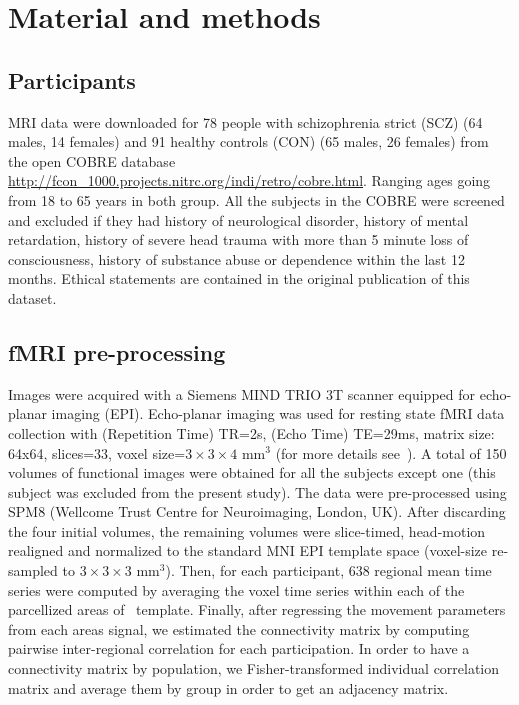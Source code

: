 
\section{Material and methods}
\subsection{Participants}
MRI data were downloaded for 78 people with schizophrenia strict (SCZ) (64 males, 14 females) and 91 healthy controls (CON) (65 males, 26 females) from the open COBRE database \url{http://fcon_1000.projects.nitrc.org/indi/retro/cobre.html}.
Ranging ages going from 18 to 65 years in both group.
All the subjects in the COBRE were screened and excluded if they had history of neurological disorder, history of mental retardation, history of severe head trauma with more than 5 minute loss of consciousness, history of substance abuse or dependence within the last 12 months.
Ethical statements are contained in the original publication of this dataset.

\subsection{fMRI pre-processing}
Images were acquired with a Siemens MIND TRIO 3T scanner equipped for echo-planar imaging (EPI).
Echo-planar imaging was used for resting state fMRI data collection with (Repetition Time) TR=2s, (Echo Time) TE=29ms, matrix size: 64x64, slices=33, voxel size=$3 \times 3 \times 4$ mm$^3$ (for more details see~\cite{cetin2014}). A total of 150 volumes of functional images were obtained for all the subjects except one (this subject was excluded from the present study). The data were pre-processed using SPM8 (Wellcome Trust Centre for Neuroimaging, London, UK).
After discarding the four initial volumes, the remaining volumes were slice-timed, head-motion realigned and normalized to the standard MNI EPI template space (voxel-size re-sampled to $3 \times 3 \times 3$ mm$^3$).
Then, for each participant, 638 regional mean time series were computed by averaging the voxel time series within each of the parcellized areas of~\cite{crossley2013a} template. 
Finally, after regressing the movement parameters from each areas signal, we estimated the connectivity matrix by computing pairwise inter-regional correlation for each participation.
In order to have a connectivity matrix by population, we Fisher-transformed individual correlation matrix and average them by group in order to get an adjacency matrix.


